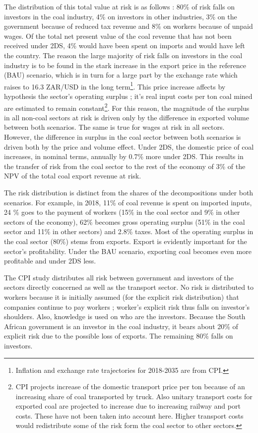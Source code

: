 \documentclass[12pt,english]{article}
\begin{document}
The distribution of this total value at risk is as follows : 80\% of risk falls on investors in the coal industry, 4\% on investors in other industries, 3\% on the government because of reduced tax revenue and 8\% on workers because of unpaid wages. Of the total net present value of the coal revenue that has not been received under 2DS, 4\% would have been spent on imports and would have left the country. %
The reason the large majority of risk falls on investors in the coal industry is to be found in the stark increase in the export price in the reference (BAU) scenario, which is in turn for a large part by the exchange rate which raises to 16.3 ZAR/USD in the long term\footnote{Inflation and exchange rate trajectories for 2018-2035 are from CPI.}. This price increase affects by hypothesis the sector's operating surplus ; it's real input costs per ton coal mined are estimated to remain constant\footnote{CPI projects increase of the domestic transport price per ton because of an increasing share of coal transported by truck. Also unitary transport costs for exported coal are projected to increase due to increasing railway and port costs. These have not been taken into account here. Higher transport costs would redistribute some of the risk form the coal sector to other sectors.}. For this reason, the magnitude of the surplus in all non-coal sectors at risk is driven only by the difference in exported volume between both scenarios. The same is true for wages at risk in all sectors. However, the difference in surplus in the coal sector between both scenarios is driven both by the price and volume effect.
Under 2DS, the domestic price of coal increases, in nominal terms, annually by 0.7\% more under 2DS. This results in the transfer of risk from the coal sector to the rest of the economy of 3\% of the NPV of the total coal export revenue at risk.

The risk distribution is distinct from the shares of the decompositions under both scenarios. For example, in 2018, 11\% of coal revenue is spent on imported inputs, 24 \% goes to the payment of workers (15\% in the coal sector and 9\% in other sectors of the economy), 62\% becomes gross operating surplus (51\% in the coal sector and 11\% in other sectors) and 2.8\% taxes.
Most of the operating surplus in the coal sector (80\%) stems from exports. Export is evidently important for the sector's profitability. Under the BAU scenario, exporting coal becomes even more profitable and under 2DS less. 

The CPI study distributes all risk between government and investors of the sectors directly concerned as well as the transport sector. No risk is distributed to workers because it is initially assumed (for the explicit risk distribution) that companies continue to pay workers ; worker's explicit risk thus falls on investor's shoulders. Also, knowledge is used on who are the investors. Because the South African government is an investor in the coal industry, it bears about 20\% of explicit risk due to the possible loss of exports. The remaining 80\% falls on investors.
\end{document}
